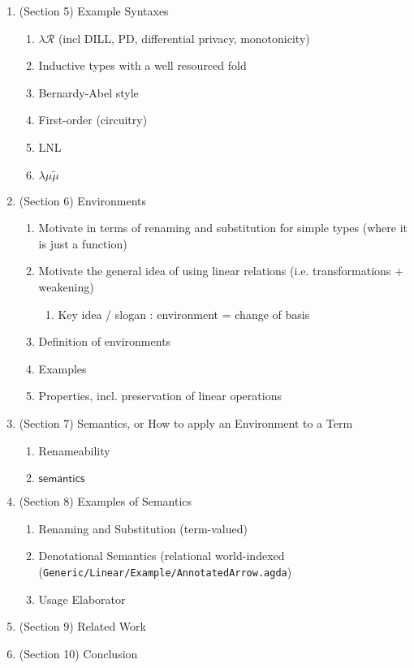\documentclass[sigplan,10pt,anonymous,review]{acmart}
\begin{document}
\begin{enumerate}
\begin{enumerate}
  \end{enumerate}
\item (Section 5) Example Syntaxes
  \begin{enumerate}
  \item $\lambda\mathcal{R}$ (incl DILL, PD, differential privacy, monotonicity)
  \item Inductive types with a well resourced fold
  \item Bernardy-Abel style
  \item First-order (circuitry)
  \item LNL
  \item $\lambda\mu\tilde{\mu}$
  \end{enumerate}
\item (Section 6) Environments
  \begin{enumerate}
  \item Motivate in terms of renaming and substitution for simple types (where it is just a function)
  \item Motivate the general idea of using linear relations (i.e. transformations + weakening)
    \begin{enumerate}
    \item Key idea / slogan : environment = change of basis
    \end{enumerate}
  \item Definition of environments
  \item Examples
  \item Properties, incl. preservation of linear operations
  \end{enumerate}
\item (Section 7) Semantics, or How to apply an Environment to a Term
  \begin{enumerate}
  \item Renameability
  \item $\mathsf{semantics}$
  \end{enumerate}
\item (Section 8) Examples of Semantics
  \begin{enumerate}
  \item Renaming and Substitution (term-valued)
  \item Denotational Semantics (relational world-indexed (\texttt{Generic/Linear/Example/AnnotatedArrow.agda})
  \item Usage Elaborator
  \end{enumerate}
\item (Section 9) Related Work
\item (Section 10) Conclusion
\end{enumerate}
\end{document}
